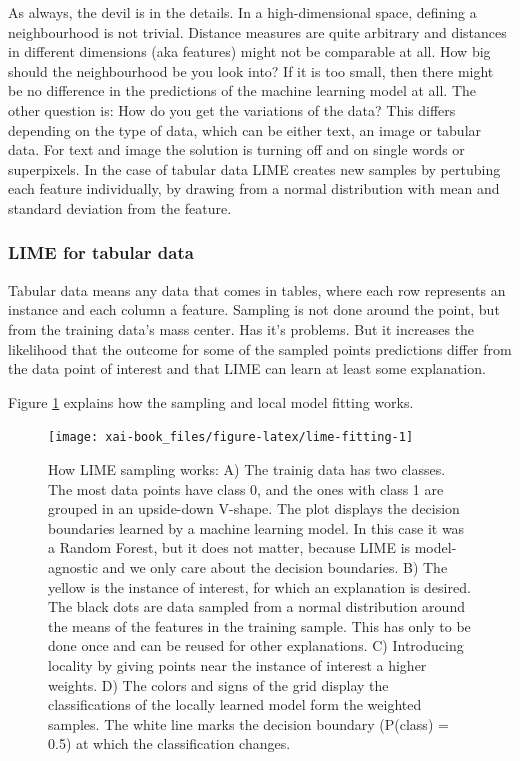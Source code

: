 \documentclass[12pt,]{krantz}
\theoremstyle{definition}
\theoremstyle{definition}
\theoremstyle{definition}
\theoremstyle{remark}
\begin{document}
As always, the devil is in the details. In a high-dimensional space,
defining a neighbourhood is not trivial. Distance measures are quite
arbitrary and distances in different dimensions (aka features) might not
be comparable at all. How big should the neighbourhood be you look into?
If it is too small, then there might be no difference in the predictions
of the machine learning model at all. The other question is: How do you
get the variations of the data? This differs depending on the type of
data, which can be either text, an image or tabular data. For text and
image the solution is turning off and on single words or superpixels. In
the case of tabular data LIME creates new samples by pertubing each
feature individually, by drawing from a normal distribution with mean
and standard deviation from the feature.

\subsubsection{LIME for tabular data}\label{lime-for-tabular-data}

Tabular data means any data that comes in tables, where each row
represents an instance and each column a feature. Sampling is not done
around the point, but from the training data's mass center. Has it's
problems. But it increases the likelihood that the outcome for some of
the sampled points predictions differ from the data point of interest
and that LIME can learn at least some explanation.

Figure \ref{fig:lime-fitting} explains how the sampling and local model
fitting works.

\begin{figure}

{\centering \texttt{[image: xai-book\_files/figure-latex/lime-fitting-1]} 

}

\caption{How LIME sampling works: A) The trainig data has two classes. The most data points have class 0, and the ones with class 1 are grouped in an upside-down V-shape. The plot displays the decision boundaries learned by a machine learning model. In this case it was a Random Forest, but it does not matter, because LIME is model-agnostic and we only care about the decision boundaries. B) The yellow is the instance of interest, for which an explanation is desired. The black dots are data sampled from a normal distribution around the means of the features in the training sample. This has only to be done once and can be reused for other explanations. C) Introducing locality by giving points near the instance of interest a higher weights. D) The colors and signs of the grid display the classifications of the locally learned model form the weighted samples. The white line marks the decision boundary (P(class) = 0.5) at which the classification changes.}\label{fig:lime-fitting}
\end{figure}
\end{document}

